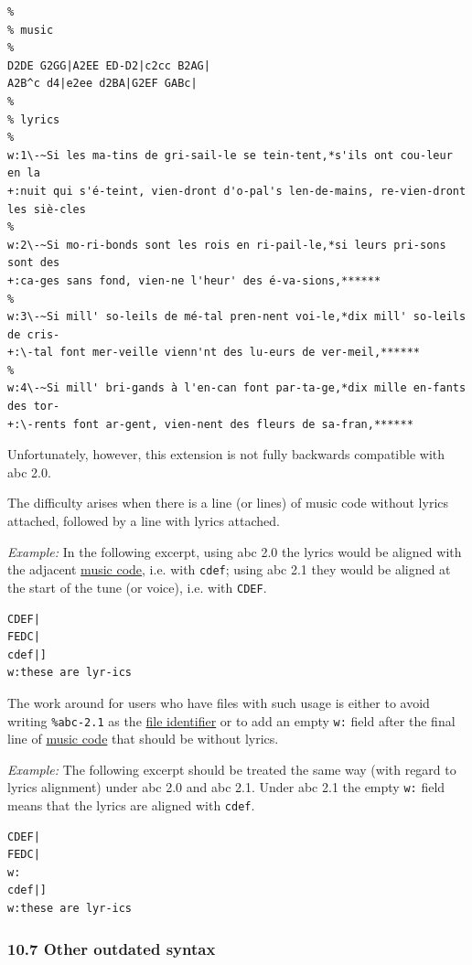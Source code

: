 \documentclass[oneside]{book}
\begin{document}
\begin{verbatim}
%
% music
%
D2DE G2GG|A2EE ED-D2|c2cc B2AG|
A2B^c d4|e2ee d2BA|G2EF GABc|
%
% lyrics
%
w:1\-~Si les ma-tins de gri-sail-le se tein-tent,*s'ils ont cou-leur en la
+:nuit qui s'é-teint, vien-dront d'o-pal's len-de-mains, re-vien-dront les siè-cles
%
w:2\-~Si mo-ri-bonds sont les rois en ri-pail-le,*si leurs pri-sons sont des
+:ca-ges sans fond, vien-ne l'heur' des é-va-sions,******
%
w:3\-~Si mill' so-leils de mé-tal pren-nent voi-le,*dix mill' so-leils de cris-
+:\-tal font mer-veille vienn'nt des lu-eurs de ver-meil,******
%
w:4\-~Si mill' bri-gands à l'en-can font par-ta-ge,*dix mille en-fants des tor-
+:\-rents font ar-gent, vien-nent des fleurs de sa-fran,******
\end{verbatim}

Unfortunately, however, this extension is not fully backwards compatible
with abc 2.0.

The difficulty arises when there is a line (or lines) of music code
without lyrics attached, followed by a line with lyrics attached.

\emph{Example:} In the following excerpt, using abc 2.0 the lyrics would
be aligned with the adjacent
\protect\hyperlink{music_code_definition}{music code}, i.e. with
\texttt{cdef}; using abc 2.1 they would be aligned at the start of the
tune (or voice), i.e. with \texttt{CDEF}.

\begin{verbatim}
CDEF|
FEDC|
cdef|]
w:these are lyr-ics
\end{verbatim}

The work around for users who have files with such usage is either to
avoid writing \texttt{\%abc-2.1} as the
\protect\hyperlink{abc_file_identification}{file identifier} or to add
an empty \texttt{w:} field after the final line of
\protect\hyperlink{music_code_definition}{music code} that should be
without lyrics.

\emph{Example:} The following excerpt should be treated the same way
(with regard to lyrics alignment) under abc 2.0 and abc 2.1. Under abc
2.1 the empty \texttt{w:} field means that the lyrics are aligned with
\texttt{cdef}.

\begin{verbatim}
CDEF|
FEDC|
w:
cdef|]
w:these are lyr-ics
\end{verbatim}

\hypertarget{other_outdated_syntax}{\subsubsection{10.7 Other outdated
syntax}\label{other_outdated_syntax}}
\end{document}
